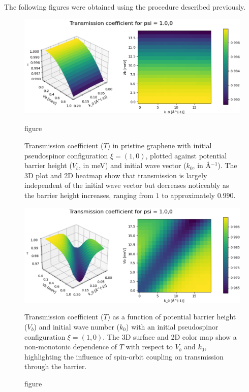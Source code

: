 The following figures were obtained using the procedure described previously.

\begin{figure}[h!]
    \centering
    \begin{minipage}[t]{0.48\textwidth}
        \centering
        \includegraphics[width=\textwidth]{../assets/images/No-Rashba/TCoefficient(1.0,0)xalpha=0beta=0}
        \caption{figure}{
            Transmission coefficient ($T$) in pristine graphene with initial pseudospinor configuration $\xi = (1, 0)$, plotted against potential barrier height ($V_b$, in meV) and initial wave vector ($k_0$, in \AA$^{-1}$). The 3D plot and 2D heatmap show that transmission is largely independent of the initial wave vector but decreases noticeably as the barrier height increases, ranging from $1$ to approximately $0.990$.
        }
        \label{fig:noRashba}
    \end{minipage}
    \hfill
    \begin{minipage}[t]{0.48\textwidth}
        \centering
        \includegraphics[width=\textwidth]{../assets/images/Rashba/TCoefficient(1.0,0)xalpha=0.2beta=-0.2}
        \caption{figure}{
            Transmission coefficient ($T$) as a function of potential barrier height ($V_b$) and initial wave number ($k_0$) with an initial pseudospinor configuration $\xi = (1, 0)$. The 3D surface and 2D color map show a non-monotonic dependence of $T$ with respect to $V_b$ and $k_0$, highlighting the influence of spin-orbit coupling on transmission through the barrier.
        }
        \label{fig:rashba}
    \end{minipage}
\end{figure}

